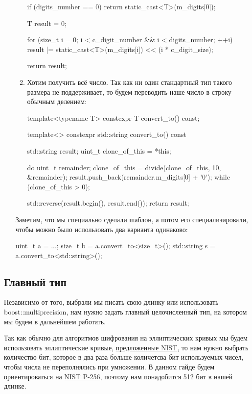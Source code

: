 \begin{itemize}
\begin{enumerate}
\begin{cppcode}
{    if (digits_number == 0) {
        return static_cast<T>(m_digits[0]);
    }

    T result = 0;

    for (size_t i = 0; i < c_digit_number && i < digits_number; ++i) {
        result |= static_cast<T>(m_digits[i]) << (i * c_digit_size);
    }

    return result;
} 
    \end{cppcode}
    \item Хотим получить всё число. Так как ни один стандартный тип такого размера не поддерживает, то будем переводить наше число в строку обычным делением:
    \begin{cppcode}
template<typename T>
constexpr T convert_to() const;

template<>
constexpr std::string convert_to() const {
    std::string result;
    uint_t clone_of_this = *this;

    do {
        uint_t remainder;
        clone_of_this = divide(clone_of_this, 10, &remainder);
        result.push_back(remainder.m_digits[0] + '0');
    } while (clone_of_this > 0);

    std::reverse(result.begin(), result.end());
    return result;
}
    \end{cppcode}
  \end{enumerate}
  Заметим, что мы специально сделали шаблон, а потом его специализировали, чтобы можно было использовать два варианта одинаково:
    \begin{cppcode}
uint_t a = ...;
size_t b = a.convert_to<size_t>();
std::string s = a.convert_to<std::string>();
    \end{cppcode}
\end{itemize}

\subsection{Главный тип}
Независимо от того, выбрали мы писать свою длинку или использовать boost::multiprecision, нам нужно задать главный целочисленный тип, на котором мы будем в дальнейшем работать.

Так как обычно для алгоритмов шифрования на эллиптических кривых мы будем использовать эллиптические кривые, \href{https://nvlpubs.nist.gov/nistpubs/SpecialPublications/NIST.SP.800-186-draft.pdf}{предложенные NIST}, то нам нужно выбрать количество бит, которое в два раза больше количетсва бит используемых чисел, чтобы числа не переполнялись при умножении. В данном гайде будем ориентироваться на \href{https://neuromancer.sk/std/nist/P-256}{NIST P-256}, поэтому нам понадобится 512 бит в нашей длинке.

